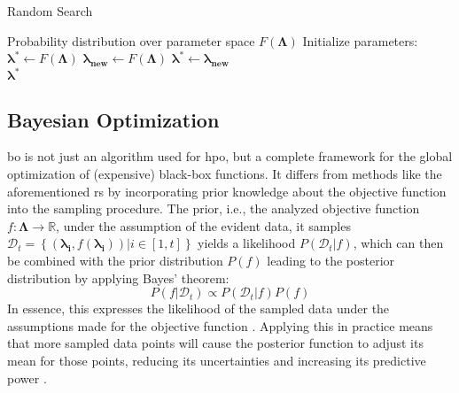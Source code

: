 \begin{algorithm}
	\caption{Random Search}
	\label{alg:randomsearch}
	\begin{algorithmic}
		\Require Probability distribution over parameter space $F(\mathbf{\Lambda})$
		\State Initialize parameters: $\mathbf{\lambda^*} \gets F(\mathbf{\Lambda})$
		\Repeat
		\State $\mathbf{\lambda_{\text{new}}} \gets F(\mathbf{\Lambda})$
		\State $\mathbf{\lambda^*} \gets \mathbf{\lambda_{\text{new}}}$
		\EndIf
		\\
		\Return $\mathbf{\lambda^*}$
	\end{algorithmic}
\end{algorithm}


\subsection{Bayesian Optimization}
\label{chap:bo}
\gls{bo} is not just an algorithm used for \gls{hpo}, but a complete framework for the global optimization of (expensive) black-box functions. It differs from methods like the aforementioned \gls{rs} by incorporating prior knowledge about the objective function into the sampling procedure. 
The prior, i.e., the analyzed objective function $f: \mathcal{\mathbf{\Lambda}} \to \mathbb{R}$, under the assumption of the evident data, it samples $\mathcal{D}_t = \left\lbrace (\mathbf{\lambda_i}, f(\mathbf{\lambda_i})) |  i\in [1,t] \right\rbrace $ yields a likelihood $P(\mathcal{D}_t|f)$, which can then be combined with the prior distribution $P(f)$ leading to the posterior distribution by applying Bayes' theorem:
\begin{equation}
	P(f|\mathcal{D}_t) \propto P(\mathcal{D}_t|f) P(f)
\end{equation}
In essence, this expresses the likelihood of the sampled data under the assumptions made for the objective function \cite{brochu2010tutorial}. 
Applying this in practice means that more sampled data points will cause the posterior function to adjust its mean for those points, reducing its uncertainties and increasing its predictive power \cite{williams2006gaussian}. 

